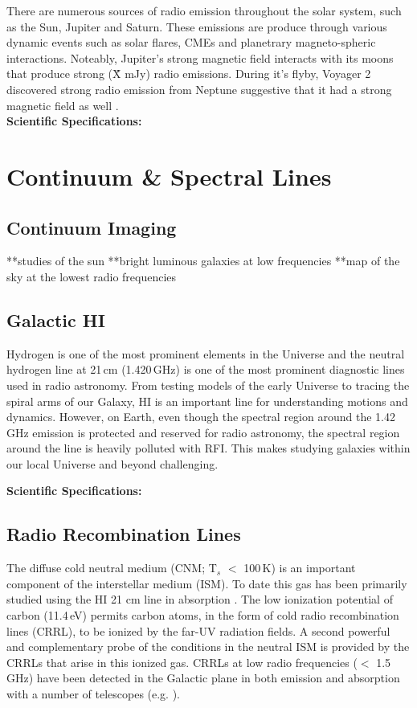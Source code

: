 There are numerous sources of radio emission throughout the solar system, such as the Sun, Jupiter and Saturn. These emissions are produce through various dynamic events such as solar flares, CMEs and planetrary magneto-spheric interactions. Noteably, Jupiter's strong magnetic field interacts with its moons that produce strong (\~ X mJy) radio emissions. During it's flyby, Voyager 2 discovered strong radio emission from Neptune suggestive that it had a strong magnetic field as well \citep{ZHANG199237}.\\ 
\textbf{Scientific Specifications:}

\section{Continuum \& Spectral Lines}

\subsection{Continuum Imaging}
**studies of the sun
**bright luminous galaxies at low frequencies
**map of the sky at the lowest radio frequencies

\subsection{Galactic HI}
Hydrogen is one of the most prominent elements in the Universe and the neutral hydrogen line at 21\,cm (1.420\,GHz) is one of the most prominent diagnostic lines used in radio astronomy. From testing models of the early Universe to tracing the spiral arms of our Galaxy, H{\sc I} is an important line for understanding motions and dynamics. However, on Earth, even though the spectral region around the 1.42\,GHz emission is protected and reserved for radio astronomy, the spectral region around the line is heavily polluted with RFI. This makes studying galaxies within our local Universe and beyond challenging. 

\textbf{Scientific Specifications:}

\subsection{Radio Recombination Lines}
The diffuse cold neutral medium (CNM; T$_{s}$ $<$ 100\,K) is an important component of the interstellar medium (ISM). To date this gas has been primarily studied using the HI 21 cm line in absorption \citep{Dickey_1990}. The low ionization potential of carbon (11.4\,eV) permits carbon atoms, in the form of cold radio recombination lines (CRRL), to be ionized by the far-UV radiation fields. A second powerful and complementary probe of the conditions in the neutral ISM is provided by the CRRLs that arise in this ionized gas. CRRLs at low radio frequencies ($<$ 1.5 GHz) have been detected in the Galactic plane in both emission and absorption with a number of telescopes (e.g. \citealt{Kantharia_2001,Salas_2019}). 

